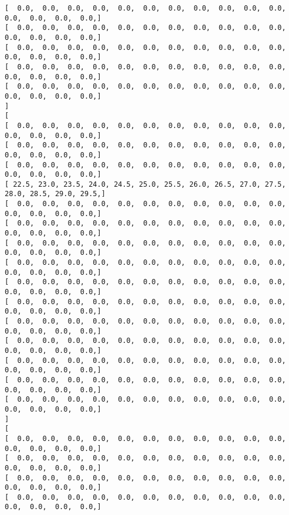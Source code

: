 \documentclass[11pt]{article}
\begin{document}
\begin{Verbatim}[commandchars=\\\{\}]
[   0.0,   0.0,   0.0,   0.0,   0.0,   0.0,   0.0,   0.0,   0.0,   0.0,   0.0,   0.0,   0.0,   0.0,   0.0, ]
[   0.0,   0.0,   0.0,   0.0,   0.0,   0.0,   0.0,   0.0,   0.0,   0.0,   0.0,   0.0,   0.0,   0.0,   0.0, ]
[   0.0,   0.0,   0.0,   0.0,   0.0,   0.0,   0.0,   0.0,   0.0,   0.0,   0.0,   0.0,   0.0,   0.0,   0.0, ]
[   0.0,   0.0,   0.0,   0.0,   0.0,   0.0,   0.0,   0.0,   0.0,   0.0,   0.0,   0.0,   0.0,   0.0,   0.0, ]
[   0.0,   0.0,   0.0,   0.0,   0.0,   0.0,   0.0,   0.0,   0.0,   0.0,   0.0,   0.0,   0.0,   0.0,   0.0, ]
]
[
[   0.0,   0.0,   0.0,   0.0,   0.0,   0.0,   0.0,   0.0,   0.0,   0.0,   0.0,   0.0,   0.0,   0.0,   0.0, ]
[   0.0,   0.0,   0.0,   0.0,   0.0,   0.0,   0.0,   0.0,   0.0,   0.0,   0.0,   0.0,   0.0,   0.0,   0.0, ]
[   0.0,   0.0,   0.0,   0.0,   0.0,   0.0,   0.0,   0.0,   0.0,   0.0,   0.0,   0.0,   0.0,   0.0,   0.0, ]
[  22.5,  23.0,  23.5,  24.0,  24.5,  25.0,  25.5,  26.0,  26.5,  27.0,  27.5,  28.0,  28.5,  29.0,  29.5, ]
[   0.0,   0.0,   0.0,   0.0,   0.0,   0.0,   0.0,   0.0,   0.0,   0.0,   0.0,   0.0,   0.0,   0.0,   0.0, ]
[   0.0,   0.0,   0.0,   0.0,   0.0,   0.0,   0.0,   0.0,   0.0,   0.0,   0.0,   0.0,   0.0,   0.0,   0.0, ]
[   0.0,   0.0,   0.0,   0.0,   0.0,   0.0,   0.0,   0.0,   0.0,   0.0,   0.0,   0.0,   0.0,   0.0,   0.0, ]
[   0.0,   0.0,   0.0,   0.0,   0.0,   0.0,   0.0,   0.0,   0.0,   0.0,   0.0,   0.0,   0.0,   0.0,   0.0, ]
[   0.0,   0.0,   0.0,   0.0,   0.0,   0.0,   0.0,   0.0,   0.0,   0.0,   0.0,   0.0,   0.0,   0.0,   0.0, ]
[   0.0,   0.0,   0.0,   0.0,   0.0,   0.0,   0.0,   0.0,   0.0,   0.0,   0.0,   0.0,   0.0,   0.0,   0.0, ]
[   0.0,   0.0,   0.0,   0.0,   0.0,   0.0,   0.0,   0.0,   0.0,   0.0,   0.0,   0.0,   0.0,   0.0,   0.0, ]
[   0.0,   0.0,   0.0,   0.0,   0.0,   0.0,   0.0,   0.0,   0.0,   0.0,   0.0,   0.0,   0.0,   0.0,   0.0, ]
[   0.0,   0.0,   0.0,   0.0,   0.0,   0.0,   0.0,   0.0,   0.0,   0.0,   0.0,   0.0,   0.0,   0.0,   0.0, ]
[   0.0,   0.0,   0.0,   0.0,   0.0,   0.0,   0.0,   0.0,   0.0,   0.0,   0.0,   0.0,   0.0,   0.0,   0.0, ]
[   0.0,   0.0,   0.0,   0.0,   0.0,   0.0,   0.0,   0.0,   0.0,   0.0,   0.0,   0.0,   0.0,   0.0,   0.0, ]
]
[
[   0.0,   0.0,   0.0,   0.0,   0.0,   0.0,   0.0,   0.0,   0.0,   0.0,   0.0,   0.0,   0.0,   0.0,   0.0, ]
[   0.0,   0.0,   0.0,   0.0,   0.0,   0.0,   0.0,   0.0,   0.0,   0.0,   0.0,   0.0,   0.0,   0.0,   0.0, ]
[   0.0,   0.0,   0.0,   0.0,   0.0,   0.0,   0.0,   0.0,   0.0,   0.0,   0.0,   0.0,   0.0,   0.0,   0.0, ]
[   0.0,   0.0,   0.0,   0.0,   0.0,   0.0,   0.0,   0.0,   0.0,   0.0,   0.0,   0.0,   0.0,   0.0,   0.0, ]

\end{Verbatim}
\end{document}
